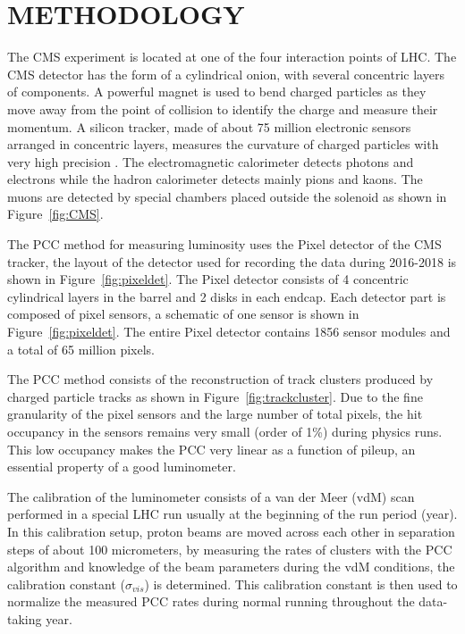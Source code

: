 \documentclass[final,12pt]{article}
\begin{document}
\section{METHODOLOGY}

The CMS experiment is located at one of the four interaction points of LHC.
The CMS detector has the form of a cylindrical onion, with several concentric layers of components.
A powerful magnet is used to bend charged particles as they move away from the point of collision to identify the charge and measure their momentum.
A silicon tracker, made of about 75 million electronic sensors arranged in concentric layers, measures the curvature of charged particles with very high precision \cite{Chatrchyan:2008aa}.
The electromagnetic calorimeter detects photons and electrons while the hadron calorimeter detects mainly pions and kaons.
The muons are detected by special chambers placed outside the solenoid as shown in Figure~\ref{fig:CMS}.

The PCC method for measuring luminosity uses the Pixel detector of the CMS tracker, the layout of the  detector used for recording the data during 2016-2018 is shown in Figure~\ref{fig:pixeldet}.
The Pixel detector consists of 4 concentric cylindrical layers in the barrel and 2 disks in each endcap.
Each detector part is composed of pixel sensors, a schematic of one sensor is shown in Figure~\ref{fig:pixeldet}.
The entire Pixel detector contains 1856 sensor modules and a total of 65 million pixels.

The PCC method consists of the reconstruction of track clusters produced by charged particle tracks as shown in Figure~\ref{fig:trackcluster}.
Due to the fine granularity of the pixel sensors and the large number of total pixels, the hit occupancy in the sensors remains very small (order of 1\%) during physics runs.
This low occupancy makes the PCC  very linear as a function of pileup, an essential property of a good luminometer.

The calibration of the luminometer consists of a van der Meer (vdM) scan performed in a special LHC run usually at the beginning of the run period (year).
In this calibration setup, proton beams are moved across each other in separation steps of about 100 micrometers,
by measuring the rates of clusters with the PCC algorithm and knowledge of the beam parameters during the vdM conditions, the calibration constant ($\sigma_{vis}$) is determined.
This calibration constant is then used to normalize the measured PCC rates during normal running throughout the data-taking year.
\end{document}
